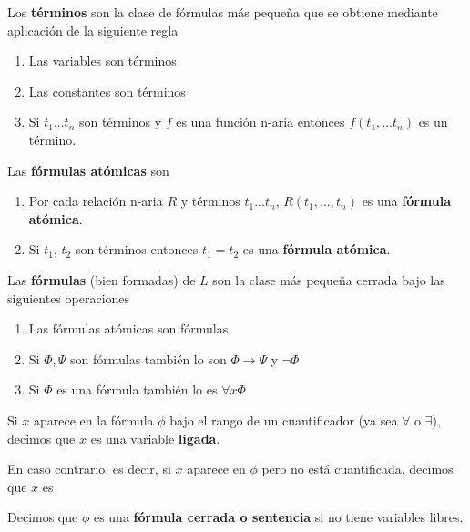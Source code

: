 \begin{defn}[Término]
Los \textbf{términos} son la clase de fórmulas más pequeña que se obtiene mediante aplicación de la siguiente regla
\begin{enumerate}
\item Las variables son términos
\item Las constantes son términos
\item Si $t_1...t_n$ son términos y $f$ es una función n-aria entonces $f(t_1,...t_n)$ es un término.
\end{enumerate}
\end{defn}

\begin{defn}
Las \textbf{fórmulas atómicas} son
\begin{enumerate}
\item Por cada relación n-aria $R$ y términos $t_1...t_n$, $R(t_1,...,t_n)$ es una \textbf{fórmula atómica}.
\item Si $t_1$, $t_2$ son términos entonces $t_1=t_2$ es una \textbf{fórmula atómica}.
\end{enumerate}
\end{defn}

\begin{defn}
Las \textbf{fórmulas} (bien formadas) de $L$ son la clase más pequeña cerrada bajo las siguientes operaciones
\begin{enumerate}
\item Las fórmulas atómicas son fórmulas
\item Si $\Phi,\Psi$ son fórmulas también lo son $\Phi \to \Psi$ y $\neg \Phi$
\item Si $\Phi$ es una fórmula también lo es $\forall x \Phi$
\end{enumerate}
\end{defn}

\begin{defn}
Si $x$ aparece en la fórmula $\phi$ bajo el rango de un cuantificador (ya sea $\forall$ o $\exists$), decimos que $x$ es una variable \textbf{ligada}.

En caso contrario, es decir, si $x$ aparece en $\phi$ pero no está cuantificada, decimos que $x$ es 
\end{defn}

\begin{defn}
Decimos que $\phi$ es una \textbf{fórmula cerrada o sentencia} si no tiene variables libres.
\end{defn}

